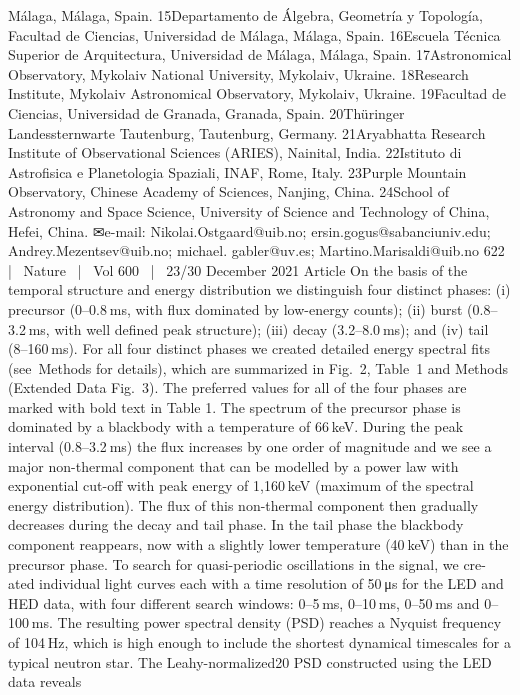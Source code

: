 Málaga, Málaga, Spain. 15Departamento de Álgebra, Geometría y Topología, Facultad de Ciencias, Universidad de Málaga, Málaga, Spain. 16Escuela Técnica Superior de Arquitectura,
Universidad de Málaga, Málaga, Spain. 17Astronomical Observatory, Mykolaiv National University, Mykolaiv, Ukraine. 18Research Institute, Mykolaiv Astronomical Observatory, Mykolaiv, Ukraine.
19Facultad de Ciencias, Universidad de Granada, Granada, Spain. 20Thüringer Landessternwarte Tautenburg, Tautenburg, Germany. 21Aryabhatta Research Institute of Observational Sciences
(ARIES), Nainital, India. 22Istituto di Astrofisica e Planetologia Spaziali, INAF, Rome, Italy. 23Purple Mountain Observatory, Chinese Academy of Sciences, Nanjing, China. 24School of Astronomy
and Space Science, University of Science and Technology of China, Hefei, China. ✉e-mail: Nikolai.Ostgaard@uib.no; ersin.gogus@sabanciuniv.edu; Andrey.Mezentsev@uib.no; michael.
gabler@uv.es; Martino.Marisaldi@uib.no
622  |  Nature  |  Vol 600  |  23/30 December 2021
Article
On the basis of the temporal structure and energy distribution we
distinguish four distinct phases: (i) precursor (0–0.8 ms, with flux
dominated by low-energy counts); (ii) burst (0.8–3.2 ms, with well
defined peak structure); (iii) decay (3.2–8.0 ms); and (iv) tail (8–160 ms).
For all four distinct phases we created detailed energy spectral fits
(see Methods for details), which are summarized in Fig. 2, Table 1 and
Methods (Extended Data Fig. 3). The preferred values for all of the four
phases are marked with bold text in Table 1.
The spectrum of the precursor phase is dominated by a blackbody
with a temperature of 66 keV. During the peak interval (0.8–3.2 ms)
the flux increases by one order of magnitude and we see a major
non-thermal component that can be modelled by a power law with
exponential cut-off with peak energy of 1,160 keV (maximum of the
spectral energy distribution). The flux of this non-thermal component
then gradually decreases during the decay and tail phase. In the tail
phase the blackbody component reappears, now with a slightly lower
temperature (40 keV) than in the precursor phase.
To search for quasi-periodic oscillations in the signal, we cre-
ated individual light curves each with a time resolution of 50 μs for
the LED and HED data, with four different search windows: 0–5 ms,
0–10 ms, 0–50 ms and 0–100 ms. The resulting power spectral density
(PSD) reaches a Nyquist frequency of 104 Hz, which is high enough to
include the shortest dynamical timescales for a typical neutron star.
The Leahy-normalized20 PSD constructed using the LED data reveals
